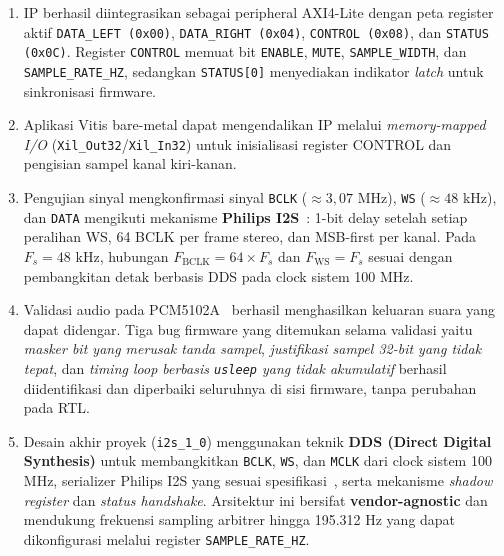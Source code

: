 \begin{enumerate}
    \item IP berhasil diintegrasikan sebagai peripheral AXI4-Lite dengan peta register aktif
    \texttt{DATA\_LEFT (0x00)}, \texttt{DATA\_RIGHT (0x04)}, \texttt{CONTROL (0x08)}, dan
    \texttt{STATUS (0x0C)}. Register \texttt{CONTROL} memuat bit \texttt{ENABLE}, \texttt{MUTE},
    \texttt{SAMPLE\_WIDTH}, dan \texttt{SAMPLE\_RATE\_HZ}, sedangkan \texttt{STATUS[0]} menyediakan
    indikator \textit{latch} untuk sinkronisasi firmware.

    \item Aplikasi Vitis bare-metal dapat mengendalikan IP melalui
    \textit{memory-mapped I/O} (\texttt{Xil\_Out32}/\texttt{Xil\_In32}) untuk inisialisasi
    register CONTROL dan pengisian sampel kanal kiri-kanan.

    \item Pengujian sinyal mengkonfirmasi sinyal \texttt{BCLK} ($\approx 3{,}07$ MHz), \texttt{WS}
    ($\approx 48$ kHz), dan \texttt{DATA} mengikuti mekanisme \textbf{Philips I2S}~\citep{philips_i2s_1986}:
    1-bit delay setelah setiap peralihan WS, 64 BCLK per frame stereo, dan MSB-first per kanal.
    Pada $F_s = 48$ kHz, hubungan $F_{\text{BCLK}} = 64 \times F_s$ dan $F_{\text{WS}} = F_s$
    sesuai dengan pembangkitan detak berbasis DDS pada clock sistem 100 MHz.

    \item Validasi audio pada PCM5102A~\citep{pcm5102a_datasheet} berhasil menghasilkan keluaran suara yang dapat
    didengar. Tiga bug firmware yang ditemukan selama validasi  yaitu \textit{masker bit
    yang merusak tanda sampel}, \textit{justifikasi sampel 32-bit yang tidak tepat}, dan
    \textit{timing loop berbasis \texttt{usleep} yang tidak akumulatif} 
    berhasil diidentifikasi dan diperbaiki seluruhnya di sisi firmware, tanpa perubahan
    pada RTL.

    \item Desain akhir proyek (\texttt{i2s\_1\_0}) menggunakan teknik \textbf{DDS (Direct Digital Synthesis)} untuk membangkitkan \texttt{BCLK}, \texttt{WS}, dan \texttt{MCLK} dari clock sistem 100 MHz, serializer Philips I2S yang sesuai spesifikasi~\citep{philips_i2s_1986}, serta mekanisme \textit{shadow register} dan \textit{status handshake}. Arsitektur ini bersifat \textbf{vendor-agnostic} dan mendukung frekuensi sampling arbitrer hingga 195.312 Hz yang dapat dikonfigurasi melalui register \texttt{SAMPLE\_RATE\_HZ}.
\end{enumerate}

